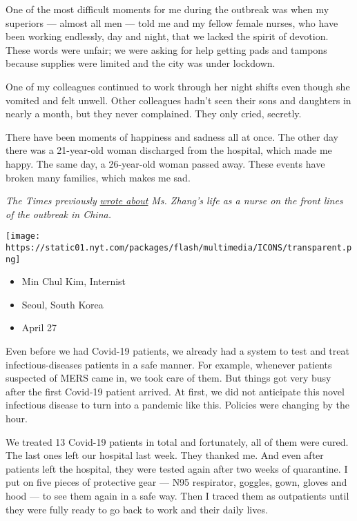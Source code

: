 One of the most difficult moments for me during the outbreak was when my
superiors --- almost all men --- told me and my fellow female nurses,
who have been working endlessly, day and night, that we lacked the
spirit of devotion. These words were unfair; we were asking for help
getting pads and tampons because supplies were limited and the city was
under lockdown.

One of my colleagues continued to work through her night shifts even
though she vomited and felt unwell. Other colleagues hadn't seen their
sons and daughters in nearly a month, but they never complained. They
only cried, secretly.

There have been moments of happiness and sadness all at once. The other
day there was a 21-year-old woman discharged from the hospital, which
made me happy. The same day, a 26-year-old woman passed away. These
events have broken many families, which makes me sad.

\emph{The Times previously}
\emph{\href{https://www.nytimes.com/2020/02/26/business/coronavirus-china-nurse-menstruation.html}{wrote
about}} \emph{Ms. Zhang's life as a nurse on the front lines of the
outbreak in China.}

\texttt{[image: https://static01.nyt.com/packages/flash/multimedia/ICONS/transparent.png]}

\begin{itemize}
\tightlist
\item
  Min Chul Kim, Internist
\item
  Seoul, South Korea
\item
  April 27
\end{itemize}

Even before we had Covid-19 patients, we already had a system to test
and treat infectious-diseases patients in a safe manner. For example,
whenever patients suspected of MERS came in, we took care of them. But
things got very busy after the first Covid-19 patient arrived. At first,
we did not anticipate this novel infectious disease to turn into a
pandemic like this. Policies were changing by the hour.

We treated 13 Covid-19 patients in total and fortunately, all of them
were cured. The last ones left our hospital last week. They thanked me.
And even after patients left the hospital, they were tested again after
two weeks of quarantine. I put on five pieces of protective gear --- N95
respirator, goggles, gown, gloves and hood --- to see them again in a
safe way. Then I traced them as outpatients until they were fully ready
to go back to work and their daily lives.

